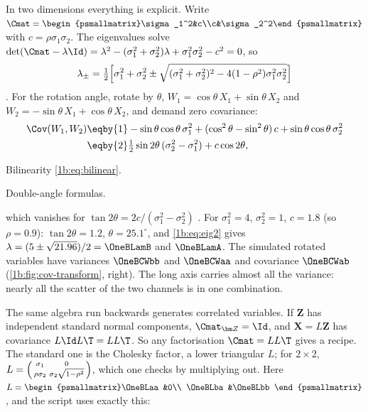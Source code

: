 In two dimensions everything is explicit. Write
$\Cmat=\begin{psmallmatrix}\sigma_1^2&c\\c&\sigma_2^2\end{psmallmatrix}$ with
$c=\rho\sigma_1\sigma_2$. The eigenvalues solve
$\det(\Cmat-\lambda\Id)=\lambda^2-(\sigma_1^2+\sigma_2^2)\lambda+\sigma_1^2\sigma_2^2-c^2=0$,
so
\begin{equation}
  \lambda_\pm=\tfrac12\Bigl[\sigma_1^2+\sigma_2^2
     \pm\sqrt{(\sigma_1^2+\sigma_2^2)^2-4(1-\rho^2)\sigma_1^2\sigma_2^2}\Bigr]
  \label{1b:eq:eig2}
\end{equation}
. For the rotation angle, rotate by $\theta$,
$W_1=\cos\theta\,X_1+\sin\theta\,X_2$ and $W_2=-\sin\theta\,X_1+\cos\theta\,X_2$,
and demand zero covariance:
\begin{align*}
  \Cov(W_1,W_2)
  &\eqby{1} -\sin\theta\cos\theta\,\sigma_1^2+(\cos^2\theta-\sin^2\theta)\,c
            +\sin\theta\cos\theta\,\sigma_2^2\\
  &\eqby{2} \tfrac12\sin2\theta\,(\sigma_2^2-\sigma_1^2)+c\cos2\theta ,
\end{align*}
\begin{explain}
  \item Bilinearity \eqref{1b:eq:bilinear}.
  \item Double-angle formulas.
\end{explain}
which vanishes for $\tan2\theta=2c/(\sigma_1^2-\sigma_2^2)$
. For $\sigma_1^2=4$, $\sigma_2^2=1$, $c=1.8$ (so
$\rho=0.9$): $\tan2\theta=1.2$, $\theta=25.1^\circ$, and
\eqref{1b:eq:eig2} gives $\lambda=(5\pm\sqrt{21.96})/2=\OneBLamB$ and
$\OneBLamA$. The simulated rotated variables have variances $\OneBCWbb$ and
$\OneBCWaa$ and covariance $\OneBCWab$ (\cref{1b:fig:cov-transform}, right).
The long axis carries almost all the variance: nearly all the scatter of the
two channels is in one combination.

The same algebra run backwards generates correlated variables. If $\bm Z$ has
independent standard normal components, $\Cmat_{\bm Z}=\Id$, and
$\bm X=L\bm Z$ has covariance $L\Id L\T=LL\T$. So any factorisation
$\Cmat=LL\T$ gives a recipe. The standard one is the Cholesky factor, a lower
triangular $L$; for $2\times2$,
$L=\begin{psmallmatrix}\sigma_1&0\\\rho\sigma_2&\sigma_2\sqrt{1-\rho^2}\end{psmallmatrix}$,
which one checks by multiplying out. Here $L=\begin{psmallmatrix}\OneBLaa&0\\
\OneBLba&\OneBLbb\end{psmallmatrix}$, and the script uses exactly this:

